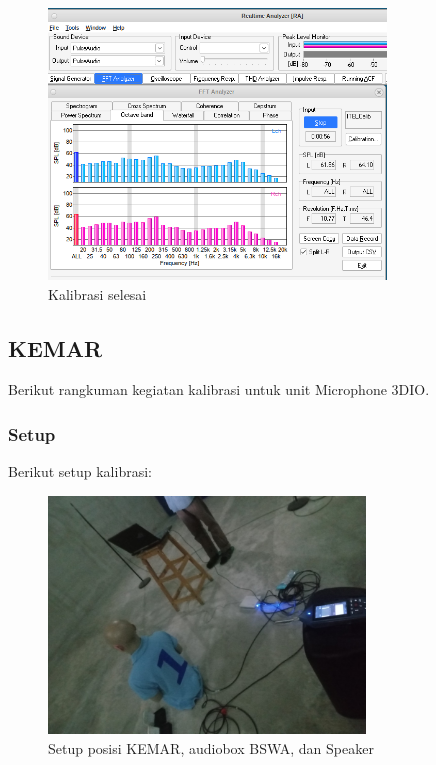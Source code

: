 \documentclass{article}
\begin{document}
\begin{itemize}
		\begin{figure}[H]
			\centering
			\includegraphics[width=0.8\textwidth,angle=0]{images/rta_fft}
			\caption{Kalibrasi selesai}
		\end{figure}
		
	\end{itemize}

	\newpage
	\subsection{KEMAR}
	
	Berikut rangkuman kegiatan kalibrasi untuk unit Microphone 3DIO.
	
	\subsubsection{Setup}
	
	Berikut setup kalibrasi:
	
	\begin{figure}[H]
		\centering
		\includegraphics[width=0.75\textwidth,angle=0]{images/kemar_calib_setup}
		\caption{Setup posisi KEMAR, audiobox BSWA, dan Speaker}
	\end{figure}
\end{document}

